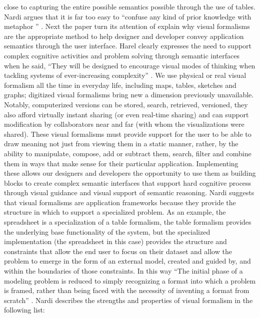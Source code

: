 \documentclass{sig-alternate}
\begin{document}
close to capturing the entire possible semantics possible through the use of
tables. Nardi argues that it  is far too easy to ``confuse any kind of prior
knowledge with metaphor '' \cite{Nardi:BeyondModels}. Next the paper turn its
attention of explain why visual formalisms are the appropriate method to help
designer and developer convey application semantics through the user interface. 
Harel  clearly expresses the need to support complex cognitive activities and
problem solving through semantic interfaces when he said, ``They will be
designed to encourage visual modes of thinking when tackling systems of
ever-increasing complexity'' \cite{Harel:1988:VisualFormalisms}. We use physical
or real visual formalism all the time in everyday life, including maps, tables,
sketches and graphs; digitized visual formalisms bring new a dimension
previously unavailable. Notably, computerized versions can be stored, search,
retrieved, versioned, they also afford virtually instant sharing (or even
real-time sharing) and can support modification by collaborators near and far
(with whom the visualizations were shared). These visual formalisms must provide
support for the user to be able to draw meaning not just from viewing them in a
static manner, rather, by the ability to manipulate, compose, add or subtract
them, search, filter and combine them in ways that make sense for their
particular application.  Implementing these allows our designers and developers
the opportunity to use them as building blocks to create complex semantic
interfaces that support hard cognitive process through visual guidance and
visual support of semantic reasoning. Nardi suggests that visual formalisms are
application frameworks because they provide the structure in which to support a
specialized problem. As an example, the spreadsheet is a specialization of a
table formalism, the table formalism provides the underlying base functionality
of the system, but the specialized implementation (the spreadsheet in this case)
provides the structure and constraints that allow the end user to focus on their
dataset and allow the problem to emerge in the form of an external model,
created and guided by, and within the boundaries of those constraints. In this
way ``The initial phase of a modeling problem is reduced to simply recognizing a
format into which a problem is framed, rather than being faced with the
necessity of inventing a format from scratch''
\cite{Nardi:90:TheSpreadsheetInterface}. Nardi describes the strengths and
properties of visual formalism in the following list:
\end{document}
